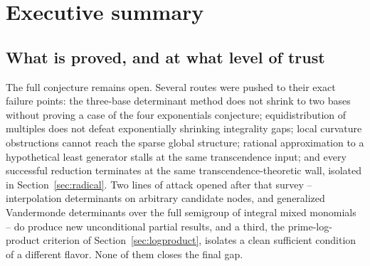 \documentclass[11pt,oneside]{article}
\theoremstyle{definition}
\theoremstyle{remark}
\begin{document}
\begin{abstract}
A fourth continuation investigates uniform, rational, integer-valued, M\"untz, Pad\'e, and
Hermite--Pad\'e approximation with every coefficient denominator included in the arithmetic
budget.  It proves that the generic normalized rational-polynomial forcing inequality is
impossible in every degree for dyadic blocks $T\ge4$; that rational contact with the
irrational-power curve at a positive rational point equals ordinary algebraic multiplicity;
and that a norm-below-one integral M\"untz polynomial gives an exact candidate-count
certificate.  Direct-scale approximation is shown to require degree linear in $T$, far above
the conditional block population.  The recent 2024--2026 literature on constrained Remez
algorithms, effective Hermite--Pad\'e methods, transcendence measures, and arithmetic holonomy
is audited.  No complete proof is claimed: the remaining approximation target is a genuinely
adelic auxiliary residual whose smallness comes from global arithmetic cancellation.

\end{abstract}

\tableofcontents
\clearpage
{}
\section{Executive summary}
\label{sec:executive}

\subsection{What is proved, and at what level of trust}
\label{ex:trust}

The full conjecture remains open.  Several routes were pushed to their exact failure points:
the three-base determinant method does not shrink to two bases without proving a case of the
four exponentials conjecture; equidistribution of multiples does not defeat exponentially
shrinking integrality gaps; local curvature obstructions cannot reach the sparse global
structure; rational approximation to a hypothetical least generator stalls at the same
transcendence input; and every successful reduction terminates at the same
transcendence-theoretic wall, isolated in Section~\ref{sec:radical}.  Two lines of attack
opened after that survey -- interpolation determinants on arbitrary candidate nodes, and
generalized Vandermonde determinants over the full semigroup of integral mixed monomials --
do produce new unconditional partial results, and a third, the prime-log-product criterion of
Section~\ref{sec:logproduct}, isolates a clean sufficient condition of a different flavor.
None of them closes the final gap.
\end{document}
